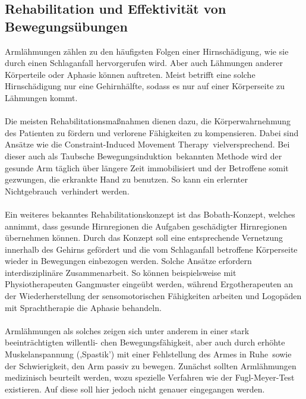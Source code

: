 \subsection{Rehabilitation und Effektivität von Bewegungsübungen}
Armlähmungen zählen zu den häufigsten Folgen einer Hirnschädigung, wie sie durch einen Schlaganfall hervorgerufen wird.\cite{Src:DGNeurorehab} Aber auch Lähmungen anderer Körperteile oder Aphasie können auftreten.\cite{Src:ApoWiki} Meist betrifft eine solche Hirnschädigung nur eine Gehirnhälfte, sodass es nur auf einer Körperseite zu Lähmungen kommt. \\ \\
Die meisten Rehabilitationsmaßnahmen dienen dazu, die Körperwahrnehmung des Patienten zu fördern und verlorene Fähigkeiten zu kompensieren. Dabei sind Ansätze wie die \glqq Constraint-Induced Movement Therapy\grqq ~vielversprechend. Bei dieser auch als \glqq Taubsche Bewegungsinduktion\grqq ~bekannten Methode wird der gesunde Arm täglich über längere Zeit immobilisiert und der Betroffene somit gezwungen, die erkrankte Hand zu benutzen.\cite{Src:ApoWiki} So kann ein \glqq erlernter Nichtgebrauch\grqq ~verhindert werden. \cite{Src:RehabNelles}\\ \\
Ein weiteres bekanntes Rehabilitationskonzept ist das Bobath-Konzept, welches annimmt, dass gesunde Hirnregionen die Aufgaben geschädigter Hirnregionen übernehmen können. Durch das Konzept soll eine entsprechende Vernetzung innerhalb des Gehirns gefördert und die vom Schlaganfall betroffene Körperseite wieder in Bewegungen einbezogen werden.\cite{Src:BobathFlex} Solche Ansätze erfordern interdisziplinäre Zusammenarbeit. So können beispielsweise mit Physiotherapeuten Gangmuster eingeübt werden, während Ergotherapeuten an der Wiederherstellung der sensomotorischen Fähigkeiten arbeiten und Logopäden mit Sprachtherapie die Aphasie behandeln.\cite{Src:ApoWiki} \\ \\
Armlähmungen als solches zeigen sich unter anderem in einer stark beeinträchtigten willentli-
chen Bewegungsfähigkeit, aber auch durch \glqq  erhöhte Muskelanspannung (,Spastik') mit einer Fehlstellung des Armes in Ruhe\grqq ~sowie der Schwierigkeit, den Arm passiv zu bewegen. \cite{Src:DGNeurorehab} Zunächst sollten Armlähmungen medizinisch beurteilt werden, wozu spezielle Verfahren wie der Fugl-Meyer-Test existieren. Auf diese soll hier jedoch nicht genauer eingegangen werden. \\ \\
